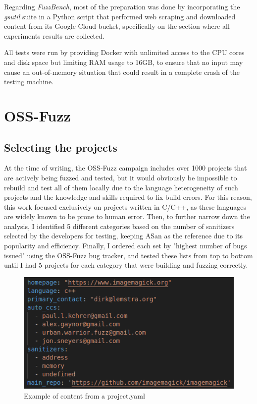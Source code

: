 Regarding \textit{FuzzBench}, most of the preparation was done by incorporating the \textit{gsutil} suite in a Python script that performed web scraping and downloaded content from its Google Cloud bucket, specifically on the section where all experiments results are collected.

All tests were run by providing Docker with unlimited access to the CPU cores and disk space but limiting RAM usage to 16GB, to ensure that no input may cause an out-of-memory situation that could result in a complete crash of the testing machine. 


\newpage
\section{OSS-Fuzz}
\subsection{Selecting the projects} \label{selection}
At the time of writing, the OSS-Fuzz campaign includes over 1000 projects that are actively being fuzzed and tested, but it would obviously be impossible to rebuild and test all of them locally due to the language heterogeneity of such projects and the knowledge and skills required to fix build errors. For this reason, this work focused exclusively on projects written in C/C++, as these languages are widely known to be prone to human error. Then, to further narrow down the analysis, I identified 5 different categories based on the number of sanitizers selected by the developers for testing, keeping ASan as the reference due to its popularity and efficiency. Finally, I ordered each set by "highest number of bugs issued" using the OSS-Fuzz bug tracker, and tested these lists from top to bottom until I had 5 projects for each category that were building and fuzzing correctly.

\begin{figure}[h]
\centering
\includegraphics[scale=0.5]{foto/project_yaml.png}
\caption{Example of content from a project.yaml}
\label{fig:project_yaml}
\end{figure}

